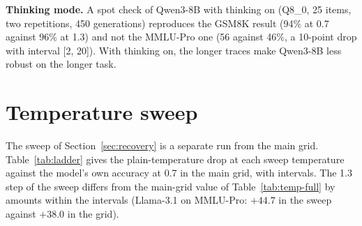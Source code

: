 \documentclass[11pt]{article}
\begin{document}
\textbf{Thinking mode.} A spot check of Qwen3-8B with thinking on (Q8\_0, 25 items, two
repetitions, 450 generations) reproduces the GSM8K result (94\% at 0.7 against 96\% at 1.3) and
not the MMLU-Pro one (56 against 46\%, a 10-point drop with interval [2, 20]). With thinking on,
the longer traces make Qwen3-8B less robust on the longer task.

\begin{table}[t]\centering
\caption{Plain-temperature accuracy at Q8\_0 for all thirteen models, the drop from $T{=}0.7$ to
$1.3$ with its 95\% item-clustered interval (bold: lower limit at or above 15, a stricter
criterion than the fragility flag), and the change in capped and strict-parse rates. Models
sorted as in Figure~\ref{fig:drops}.}
\label{tab:temp-full}
\footnotesize\setlength{\tabcolsep}{4pt}
\end{table}

\begin{table}[t]
\begin{minipage}[t]{0.46\textwidth}\centering
\caption{Plain-temperature accuracy drop from $T{=}0.7$ to $1.3$ (pp, point estimates) at each
quantization level of the main grid (150 generations per cell).}
\label{tab:quant-drops}
\footnotesize\setlength{\tabcolsep}{4pt}\resizebox{\linewidth}{!}{}
\end{minipage}\hfill
\begin{minipage}[t]{0.5\textwidth}\centering
\caption{Stratified MMLU-Pro subset against the fixed business subset: plain-temperature
accuracy at Q8\_0 and the drop with its interval.}
\label{tab:strat}
\footnotesize\setlength{\tabcolsep}{4pt}\resizebox{\linewidth}{!}{}
\end{minipage}
\end{table}

\section{Temperature sweep}
\label{app:ladder}

The sweep of Section~\ref{sec:recovery} is a separate run from the main grid.
Table~\ref{tab:ladder} gives the plain-temperature drop at each sweep temperature against the
model's own accuracy at 0.7 in the main grid, with intervals. The 1.3 step of the sweep differs
from the main-grid value of Table~\ref{tab:temp-full} by amounts within the intervals
(Llama-3.1 on MMLU-Pro: $+44.7$ in the sweep against $+38.0$ in the grid).
\end{document}
